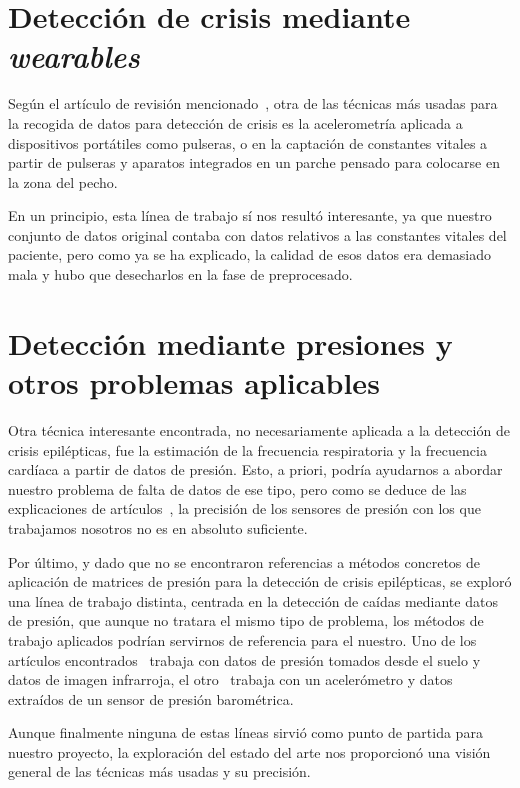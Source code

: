 \section{Detección de crisis mediante \textit{wearables}}

Según el artículo de revisión mencionado~\cite{ramgopal2014epilepsy}, otra de las técnicas más usadas para la recogida de datos para detección de crisis es la acelerometría aplicada a dispositivos portátiles como pulseras, o en la captación de constantes vitales a partir de pulseras y aparatos integrados en un parche pensado para colocarse en la zona del pecho. 

En un principio, esta línea de trabajo sí nos resultó interesante, ya que nuestro conjunto de datos original contaba con datos relativos a las constantes vitales del paciente, pero como ya se ha explicado, la calidad de esos datos era demasiado mala y hubo que desecharlos en la fase de preprocesado. 

\section{Detección mediante presiones y otros problemas aplicables}

Otra técnica interesante encontrada, no necesariamente aplicada a la detección de crisis epilépticas, fue la estimación de la frecuencia respiratoria y la frecuencia cardíaca a partir de datos de presión. Esto, a priori, podría ayudarnos a abordar nuestro problema de falta de datos de ese tipo, pero como se deduce de las explicaciones de artículos~\cite{kortelainen2012, guerreromora2012}, la precisión de los sensores de presión con los que trabajamos nosotros no es en absoluto suficiente. 

Por último, y dado que no se encontraron referencias a métodos concretos de aplicación de matrices de presión para la detección de crisis epilépticas, se exploró una línea de trabajo distinta, centrada en la detección de caídas mediante datos de presión, que aunque no tratara el mismo tipo de problema, los métodos de trabajo aplicados podrían servirnos de referencia para el nuestro. Uno de los artículos encontrados~\cite{huanwen2010} trabaja con datos de presión tomados desde el suelo y datos de imagen infrarroja, el otro~\cite{tolkiehn2011} trabaja con un acelerómetro y datos extraídos de un sensor de presión barométrica. 

Aunque finalmente ninguna de estas líneas sirvió como punto de partida para nuestro proyecto, la exploración del estado del arte nos proporcionó una visión general de las técnicas más usadas y su precisión. 


